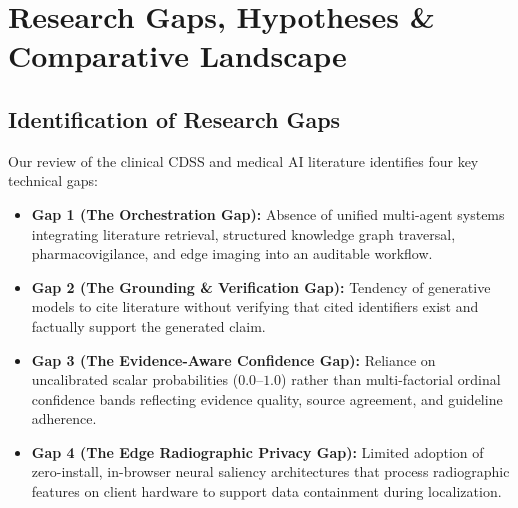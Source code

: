 \documentclass[journal,10pt,twocolumn]{IEEEtran}
\begin{document}
\section{Research Gaps, Hypotheses \& Comparative Landscape}

\subsection{Identification of Research Gaps}
Our review of the clinical CDSS and medical AI literature identifies four key technical gaps:
\begin{itemize}
    \item \textbf{Gap 1 (The Orchestration Gap):} Absence of unified multi-agent systems integrating literature retrieval, structured knowledge graph traversal, pharmacovigilance, and edge imaging into an auditable workflow.
    \item \textbf{Gap 2 (The Grounding \& Verification Gap):} Tendency of generative models to cite literature without verifying that cited identifiers exist and factually support the generated claim.
    \item \textbf{Gap 3 (The Evidence-Aware Confidence Gap):} Reliance on uncalibrated scalar probabilities ($0.0$--$1.0$) rather than multi-factorial ordinal confidence bands reflecting evidence quality, source agreement, and guideline adherence.
    \item \textbf{Gap 4 (The Edge Radiographic Privacy Gap):} Limited adoption of zero-install, in-browser neural saliency architectures that process radiographic features on client hardware to support data containment during localization.
\end{itemize}
\end{document}
